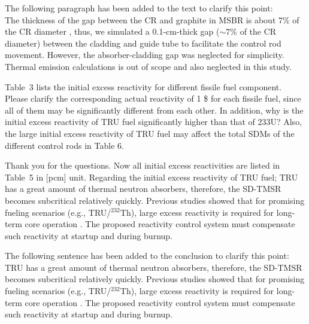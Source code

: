 \documentclass[answers,11pt]{exam}
\begin{document}
\begin{questions}
\begin{solution}
	The following paragraph has been added to the text to clarify this point:\\
	
	The thickness of the gap between the CR and graphite in MSBR is about 7\% of the CR diameter \cite{robertson_conceptual_1971}, thus, we simulated a 0.1-cm-thick gap ($\sim$7\% of the CR diameter) between the cladding and guide tube to facilitate the control rod movement. However, the absorber-cladding gap was neglected for simplicity. Thermal emission calculations is out of scope and also neglected in this study.
	
	
\end{solution}

\question Table~3 lists the initial excess reactivity for different fissile fuel component. Please clarify the corresponding actual reactivity of 1 \$ for each fissile fuel, since all of them may be significantly different from each other. In addition, why is the initial excess reactivity of TRU fuel significantly higher than that of 233U? Also, the large initial excess reactivity of TRU fuel may affect the total SDMs of the different control rods in Table 6.
\begin{solution}
	
	Thank you for the questions. Now all initial excess reactivities are listed in Table~5 in [pcm] unit. Regarding the initial excess reactivity of TRU fuel; TRU has a great amount of thermal neutron absorbers, therefore, the SD-TMSR becomes subcritical relatively quickly. Previous studies showed that for promising fueling scenarios (e.g., TRU/$^{232}$Th), large excess reactivity is required for long-term core operation \cite{ashraf2020Strategies,betzler2017assessment,rykhlevskii_fuel_2019}. The proposed reactivity control system must compensate such reactivity at startup and during burnup.
	
	The following sentence has been added to the conclusion to clarify this point:\\
	
	TRU has a great amount of thermal neutron absorbers, therefore, the SD-TMSR becomes subcritical relatively quickly. Previous studies showed that for promising fueling scenarios (e.g., TRU/$^{232}$Th), large excess reactivity is required for long-term core operation \cite{ashraf2020Strategies,betzler2017assessment,rykhlevskii_fuel_2019}. The proposed reactivity control system must compensate such reactivity at startup and during burnup.
	

\end{solution}
\end{questions}
\end{document}
